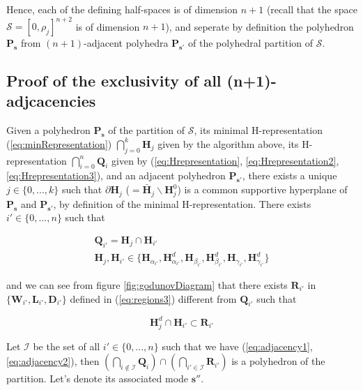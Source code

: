 \noindent Hence, each of the defining half-spaces is of dimension $n+1$ \cite{Gruenbaum2003} (recall that the space $\mathcal{S} = [0,\rho_{j}]^{n+2}$ is of dimension $n+1$), and seperate by definition the polyhedron $\textbf{P}_{\boldsymbol s}$ from $(n+1)$-adjacent polyhedra $\textbf{P}_{\boldsymbol s'}$ of the polyhedral partition of $\mathcal{S}$.


\subsection{Proof of the exclusivity of all (n+1)-adjcacencies}\label{sec:adjacency}

Given a polyhedron $\textbf{P}_{\boldsymbol s}$ of the partition of $\mathcal{S}$, its minimal H-representation (\ref{eq:minRepresentation}) $\bigcap_{j=0}^{k} \textbf{H}_{j}$ given by the algorithm above, its H-representation $\bigcap_{i=0}^{n} \textbf{Q}_{i}$ given by (\ref{eq:Hrepresentation}, \ref{eq:Hrepresentation2}, \ref{eq:Hrepresentation3}), and an adjacent polyhedron $\textbf{P}_{\boldsymbol s'}$, there exists a unique $j\in\{0,...,k\}$ such that $\partial \textbf{H}_{j}$ ($=\bar{\textbf{H}}_{j} \backslash \textbf{H}^{0}_{j}$) is a common supportive hyperplane of $\textbf{P}_{\boldsymbol s}$ and $\textbf{P}_{\boldsymbol s'}$, by definition of the minimal H-representation. There exists $i'\in\{0,...,n\}$ such that

\begin{equation}
\begin{array}{l}
\textbf{Q}_{i'}=\textbf{H}_{j}\cap \textbf{H}_{i'}\\
\textbf{H}_{j}, \textbf{H}_{i'}\in \{\textbf{H}_{\alpha_{i'}}, \textbf{H}^{d}_{\alpha_{i'}}, \textbf{H}_{\beta_{i'}}, \textbf{H}^{d}_{\beta_{i'}}, \textbf{H}_{\gamma_{i'}}, \textbf{H}^{d}_{\gamma_{i'}}\}
\end{array}
\label{eq:adjacency1}
\end{equation}

\noindent and we can see from figure \ref{fig:godunovDiagram} that there exists $\textbf{R}_{i'}$ in $\{\textbf{W}_{i'}, \textbf{L}_{i'}, \textbf{D}_{i'}\}$ defined in (\ref{eq:regions3}) different from $\textbf{Q}_{i'}$ such that

\begin{equation}
\textbf{H}^{d}_{j}\cap \textbf{H}_{i'}\subset \textbf{R}_{i'}
\label{eq:adjacency2}
\end{equation}

\noindent Let $\mathcal{I}$ be the set of all $i'\in\{0,...,n\}$ such that we have (\ref{eq:adjacency1}, \ref{eq:adjacency2}), then $(\bigcap_{i\notin \mathcal{I}} \textbf{Q}_{i})\cap (\bigcap_{i'\in\mathcal{I}}\textbf{R}_{i'})$ is a polyhedron of the partition. Let's denote its associated mode $\boldsymbol s''$.

